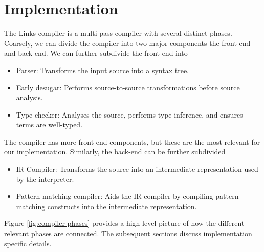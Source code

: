 \chapter{Implementation}
The Links compiler is a multi-pass compiler with several distinct phases.
Coarsely, we can divide the compiler into two major components the front-end and back-end.
We can further subdivide the front-end into
\begin{itemize}
  \item Parser: Transforms the input source into a syntax tree.
  \item Early desugar: Performs source-to-source transformations before source analysis.
  \item Type checker: Analyses the source, performs type inference, and ensures terms are well-typed.
\end{itemize}
The compiler has more front-end components, but these are the most relevant for our implementation.
Similarly, the back-end can be further subdivided
\begin{itemize}
  \item IR Compiler: Transforms the source into an intermediate representation used by the interpreter.
  \item Pattern-matching compiler: Aids the IR compiler by compiling pattern-matching constructs into the intermediate representation.
\end{itemize}
Figure \ref{fig:compiler-phases} provides a high level picture of how the different relevant phases are connected. The subsequent sections discuss implementation specific details.
